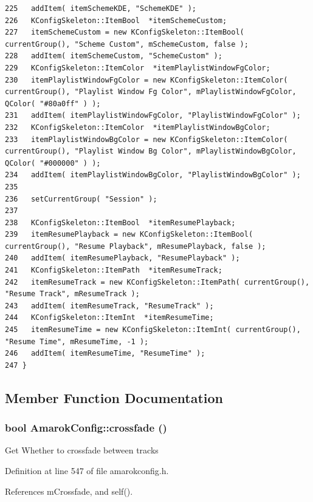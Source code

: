 \begin{verbatim}
225   addItem( itemSchemeKDE, "SchemeKDE" );
226   KConfigSkeleton::ItemBool  *itemSchemeCustom;
227   itemSchemeCustom = new KConfigSkeleton::ItemBool( currentGroup(), "Scheme Custom", mSchemeCustom, false );
228   addItem( itemSchemeCustom, "SchemeCustom" );
229   KConfigSkeleton::ItemColor  *itemPlaylistWindowFgColor;
230   itemPlaylistWindowFgColor = new KConfigSkeleton::ItemColor( currentGroup(), "Playlist Window Fg Color", mPlaylistWindowFgColor, QColor( "#80a0ff" ) );
231   addItem( itemPlaylistWindowFgColor, "PlaylistWindowFgColor" );
232   KConfigSkeleton::ItemColor  *itemPlaylistWindowBgColor;
233   itemPlaylistWindowBgColor = new KConfigSkeleton::ItemColor( currentGroup(), "Playlist Window Bg Color", mPlaylistWindowBgColor, QColor( "#000000" ) );
234   addItem( itemPlaylistWindowBgColor, "PlaylistWindowBgColor" );
235 
236   setCurrentGroup( "Session" );
237 
238   KConfigSkeleton::ItemBool  *itemResumePlayback;
239   itemResumePlayback = new KConfigSkeleton::ItemBool( currentGroup(), "Resume Playback", mResumePlayback, false );
240   addItem( itemResumePlayback, "ResumePlayback" );
241   KConfigSkeleton::ItemPath  *itemResumeTrack;
242   itemResumeTrack = new KConfigSkeleton::ItemPath( currentGroup(), "Resume Track", mResumeTrack );
243   addItem( itemResumeTrack, "ResumeTrack" );
244   KConfigSkeleton::ItemInt  *itemResumeTime;
245   itemResumeTime = new KConfigSkeleton::ItemInt( currentGroup(), "Resume Time", mResumeTime, -1 );
246   addItem( itemResumeTime, "ResumeTime" );
247 }
\end{verbatim}\normalsize 


\subsection{Member Function Documentation}
\subsubsection{\setlength{\rightskip}{0pt plus 5cm}bool Amarok\-Config::crossfade ()\hspace{0.3cm}{\tt  [inline, static]}}\label{classAmarokConfig_AmarokConfige56}


Get Whether to crossfade between tracks 

Definition at line 547 of file amarokconfig.h.

References m\-Crossfade, and self().

